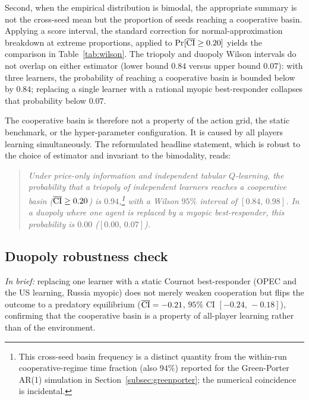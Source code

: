 Second, when the empirical distribution is bimodal, the
appropriate summary is not the cross-seed mean but the
proportion of seeds reaching a cooperative basin.
Applying a \citet{wilson1927} score interval, the standard
correction for normal-approximation breakdown at extreme
proportions, applied to $\Pr[\overline{\mathrm{CI}} \geq 0.20]$ yields the comparison in
Table~\ref{tab:wilson}. The triopoly and duopoly Wilson intervals
do not overlap on either estimator (lower bound $0.84$ versus
upper bound $0.07$): with three learners, the probability of
reaching a cooperative basin is bounded below by $0.84$;
replacing a single learner with a rational myopic best-responder
collapses that probability below $0.07$.

The cooperative basin is therefore not a property of the action
grid, the static benchmark, or the hyper-parameter configuration.
It is caused by all players learning simultaneously. The
reformulated headline statement, which is robust to the choice of
estimator and invariant to the bimodality, reads:

\begin{quote}
  \itshape
  Under price-only information and independent tabular
  $Q$-learning, the probability that a triopoly of independent
  learners reaches a cooperative basin ($\overline{\mathrm{CI}} \geq 0.20$) is
  $0.94$,\footnote{This cross-seed basin frequency is a distinct
  quantity from the within-run cooperative-regime time fraction
  (also $94\%$) reported for the Green-Porter AR(1) simulation in
  Section~\ref{subsec:greenporter}; the numerical coincidence is
  incidental.} with a Wilson $95\%$ interval of $[0.84,\,0.98]$. In
  a duopoly where one agent is replaced by a myopic
  best-responder, this probability is $0.00$
  ($[0.00,\,0.07]$).
\end{quote}



\subsection{Duopoly robustness check}
\label{subsec:duopoly}

\emph{In brief:} replacing one learner with a static Cournot
best-responder (OPEC and the US learning, Russia myopic) does not merely
weaken cooperation but flips the outcome to a predatory
equilibrium ($\overline{\mathrm{CI}} = -0.21$, $95\%$ CI $[-0.24,\,-0.18]$), confirming
that the cooperative basin is a property of all-player learning rather
than of the environment.

